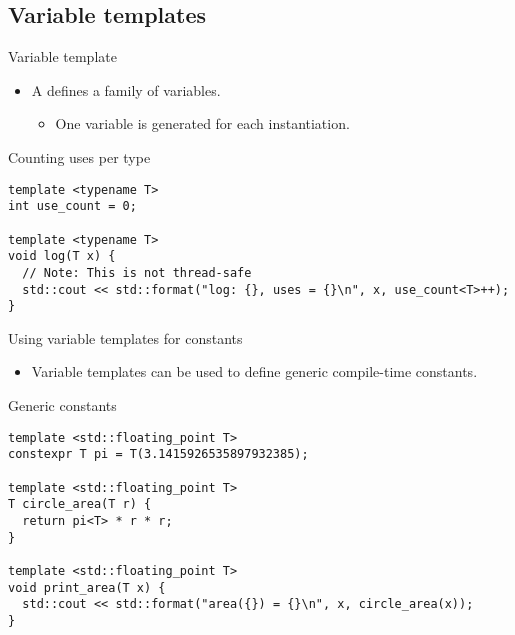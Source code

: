 \subsection{Variable templates}

\begin{frame}[t,fragile]{Variable template}
\begin{itemize}
  \item A  defines a family of variables.
    \begin{itemize}
      \item One variable is generated for each instantiation.
    \end{itemize}
\end{itemize}

\begin{block}{Counting uses per type}
\begin{lstlisting}
template <typename T>
int use_count = 0;

template <typename T>
void log(T x) {
  // Note: This is not thread-safe
  std::cout << std::format("log: {}, uses = {}\n", x, use_count<T>++);
}
\end{lstlisting}
\end{block}
\end{frame}

\begin{frame}[t,fragile]{Using variable templates for constants}
\begin{itemize}
  \item Variable templates can be used to define generic compile-time constants.
\end{itemize}

\begin{block}{Generic constants}
\begin{lstlisting}
template <std::floating_point T>
constexpr T pi = T(3.1415926535897932385); 

template <std::floating_point T>
T circle_area(T r) {
  return pi<T> * r * r;
}

template <std::floating_point T>
void print_area(T x) {
  std::cout << std::format("area({}) = {}\n", x, circle_area(x));
}
\end{lstlisting}
\end{block}

\end{frame}


